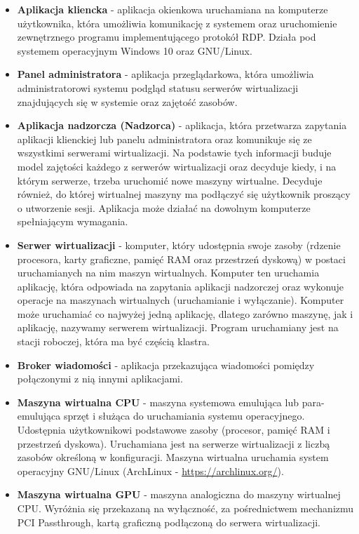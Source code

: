 \documentclass[../wstep.tex]{subfiles}
\begin{document}
\begin{itemize}
  \item \textbf{Aplikacja kliencka} - aplikacja okienkowa uruchamiana na komputerze użytkownika, która umożliwia komunikację z systemem oraz uruchomienie zewnętrznego programu implementującego protokół RDP. Działa pod systemem operacyjnym Windows 10 oraz GNU/Linux.
  \item \textbf{Panel administratora} - aplikacja przeglądarkowa, która umożliwia administratorowi systemu podgląd statusu serwerów wirtualizacji znajdujących się w systemie oraz zajętość zasobów.
  \item \textbf{Aplikacja nadzorcza (Nadzorca)} - aplikacja, która przetwarza zapytania aplikacji klienckiej lub panelu administratora oraz komunikuje się ze wszystkimi serwerami wirtualizacji. Na podstawie tych informacji buduje model zajętości każdego z serwerów wirtualizacji oraz decyduje kiedy, i na którym serwerze, trzeba uruchomić nowe maszyny wirtualne. Decyduje również, do której wirtualnej maszyny ma podłączyć się użytkownik proszący o utworzenie sesji. Aplikacja może działać na dowolnym komputerze spełniającym wymagania.
  \item \textbf{Serwer wirtualizacji} - komputer, który udostępnia swoje zasoby (rdzenie procesora, karty graficzne, pamięć RAM oraz przestrzeń dyskową) w postaci uruchamianych na nim maszyn wirtualnych. Komputer ten uruchamia aplikację, która odpowiada na zapytania aplikacji nadzorczej oraz wykonuje operacje na maszynach wirtualnych (uruchamianie i wyłączanie). Komputer może uruchamiać co najwyżej jedną aplikację, dlatego zarówno maszynę, jak i aplikację, nazywamy serwerem wirtualizacji. Program uruchamiany jest na stacji roboczej, która ma być częścią klastra.
  \item \textbf{Broker wiadomości} - aplikacja przekazująca wiadomości pomiędzy połączonymi z nią innymi aplikacjami.
  \item \textbf{Maszyna wirtualna CPU} - maszyna systemowa emulująca lub para-emulująca sprzęt i służąca do uruchamiania systemu operacyjnego. Udostępnia użytkownikowi podstawowe zasoby (procesor, pamięć RAM i przestrzeń dyskowa). Uruchamiana jest na serwerze wirtualizacji z liczbą zasobów określoną w konfiguracji. Maszyna wirtualna uruchamia system operacyjny GNU/Linux (ArchLinux - \url{https://archlinux.org/}).
  \item \textbf{Maszyna wirtualna GPU} - maszyna analogiczna do maszyny wirtualnej CPU. Wyróżnia się przekazaną na wyłączność, za pośrednictwem mechanizmu PCI Passthrough, kartą graficzną podłączoną do serwera wirtualizacji.

\end{itemize}
\end{document}
